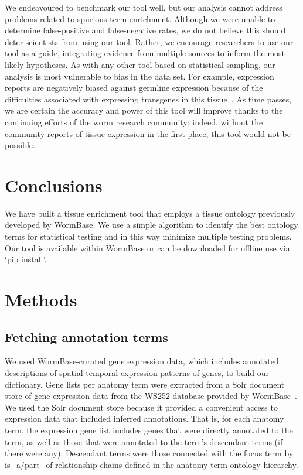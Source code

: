 We endeavoured to benchmark our tool well, but our analysis cannot address
problems related to spurious term enrichment. Although we were unable to
determine false-positive and false-negative rates, we do not believe this should
deter scientists from using our tool. Rather, we encourage researchers to use our
tool as a guide, integrating evidence from multiple sources to inform the most
likely hypotheses. As with any other tool based on statistical sampling, our
analysis is most vulnerable to bias in the data set. For example, expression
reports are negatively biased against germline expression because of the
difficulties associated with expressing transgenes in this
tissue~\citep{Kelly1997}. As time passes, we are certain the accuracy and power
of this tool will improve thanks to the continuing efforts of the  worm research
community; indeed, without the community reports of tissue expression in the
first place, this tool would not be possible.

\section*{Conclusions}

We have built a tissue enrichment tool that employs a tissue ontology previously
developed by WormBase. We use a simple algorithm to identify the best ontology
terms for statistical testing and in this way minimize multiple testing problems.
Our tool is available within WormBase or can be downloaded for offline use via
`pip install'.

\section*{Methods}
\subsection*{Fetching annotation terms}
We used WormBase-curated gene expression data, which includes annotated
descriptions of spatial-temporal expression patterns of genes, to build our
dictionary. Gene lists per anatomy term were extracted from a Solr document
store of gene expression data from the WS252 database provided by
WormBase~\citep{Howe2016}. We used the Solr document store because it provided a
convenient access to expression data that included inferred annotations. That
is, for each anatomy term, the expression gene list includes genes that were
directly annotated to the term, as well as those that were annotated to the
term's descendant terms (if there were any). Descendant terms were those
connected with the focus term by is\_a/part\_of relationship chains defined in
the anatomy term ontology hierarchy.

